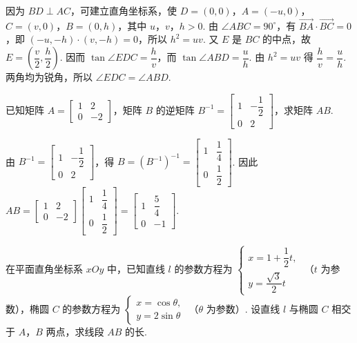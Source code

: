 \begin{solution}
因为 \(BD\perp AC\)，可建立直角坐标系，使 \(D=(0,0)\)，\(A=(-u,0)\)，\(C=(v,0)\)，\(B=(0,h)\)，其中 \(u\)，\(v\)，\(h>0\). 由 \(\angle ABC=90^\circ\)，有 \(\overrightarrow{BA}\cdot\overrightarrow{BC}=0\)，即 \((-u,-h)\cdot(v,-h)=0\)，所以 \(h^2=uv\). 又 \(E\) 是 \(BC\) 的中点，故 \(E=\left(\dfrac v2,\dfrac h2\right)\). 因而 \(\tan\angle EDC=\dfrac{h}{v}\)，而 \(\tan\angle ABD=\dfrac{u}{h}\). 由 \(h^2=uv\) 得 \(\dfrac{h}{v}=\dfrac{u}{h}\). 两角均为锐角，所以 \(\angle EDC=\angle ABD\).
\end{solution}

\reuseproblemnumber
\begin{problem}[B]
已知矩阵 \(A=\begin{bmatrix}1&2\\0&-2\end{bmatrix}\)，矩阵 \(B\) 的逆矩阵 \(B^{-1}=\begin{bmatrix}1&-\dfrac12\\0&2\end{bmatrix}\)，求矩阵 \(AB\).
\end{problem}

\begin{solution}
由 \(B^{-1}=\begin{bmatrix}1&-\dfrac12\\0&2\end{bmatrix}\)，得 \(B=(B^{-1})^{-1}=\begin{bmatrix}1&\dfrac14\\0&\dfrac12\end{bmatrix}\). 因此 \(AB=\begin{bmatrix}1&2\\0&-2\end{bmatrix}\begin{bmatrix}1&\dfrac14\\0&\dfrac12\end{bmatrix}=\begin{bmatrix}1&\dfrac54\\0&-1\end{bmatrix}\).
\end{solution}

\reuseproblemnumber
\begin{problem}[C]
在平面直角坐标系 \(xOy\) 中，已知直线 \(l\) 的参数方程为
\(
\begin{cases}
x=1+\dfrac12t,\\
y=\dfrac{\sqrt3}{2}t
\end{cases}
\)
（\(t\) 为参数），椭圆 \(C\) 的参数方程为
\(
\begin{cases}
x=\cos\theta,\\
y=2\sin\theta
\end{cases}
\)
（\(\theta\) 为参数）. 设直线 \(l\) 与椭圆 \(C\) 相交于 \(A\)，\(B\) 两点，求线段 \(AB\) 的长.
\end{problem}

